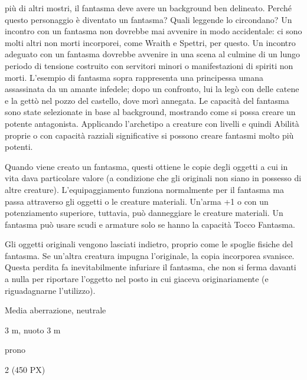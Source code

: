 \begin{multicols}{2}
{più di altri mostri, il fantasma deve avere un background ben delineato. Perché questo personaggio è diventato un fantasma? Quali leggende lo circondano? Un incontro con un fantasma non dovrebbe mai avvenire in modo accidentale: ci sono molti altri non morti incorporei, come Wraith e Spettri, per questo. Un incontro adeguato con un fantasma dovrebbe avvenire in una scena al culmine di un lungo periodo di tensione costruito con servitori minori o manifestazioni di spiriti non morti. L'esempio di fantasma sopra rappresenta una principessa umana assassinata da un amante infedele; dopo un confronto, lui la legò con delle catene e la gettò nel pozzo del castello, dove morì annegata. Le capacità del fantasma sono state selezionate in base al background, mostrando come si possa creare un potente antagonista. Applicando l'archetipo a creature con livelli e quindi Abilità proprie o con capacità razziali significative si possono creare fantasmi molto più potenti.

Quando viene creato un fantasma, questi ottiene le copie degli oggetti a cui in vita dava particolare valore (a condizione che gli originali non siano in possesso di altre creature). L'equipaggiamento funziona normalmente per il fantasma ma passa attraverso gli oggetti o le creature materiali. Un'arma +1 o con un potenziamento superiore, tuttavia, può danneggiare le creature materiali. Un fantasma può usare scudi e armature solo se hanno la capacità Tocco Fantasma.

Gli oggetti originali vengono lasciati indietro, proprio come le spoglie fisiche del fantasma. Se un'altra creatura impugna l'originale, la copia incorporea svanisce. Questa perdita fa inevitabilmente infuriare il fantasma, che non si ferma davanti a nulla per riportare l'oggetto nel posto in cui giaceva originariamente (e riguadagnarne l'utilizzo).

\begin{description}[noitemsep, topsep=0pt, parsep=0pt, partopsep=0pt, itemsep=1pt, leftmargin=2.35cm,  labelwidth=2.2cm, itemindent=0cm, listparindent=0pt] %
\setlength{\baselineskip}{10pt}
\item[\textbf{Taglia/Tipo}] Media aberrazione, neutrale
\item[\textbf{Caratt.}] 
\item[\textbf{Punti Ferita}] 
\item[\textbf{Movimento}] 3 m, nuoto 3 m
\item[\textbf{Tiri Salvez.}] 
\item[\textbf{Immunità}] prono
\item[\textbf{Sensi}] 
\item[\textbf{Sfida}] 2 (450 PX)
\end{description}
\smallskip

}
\end{multicols}
